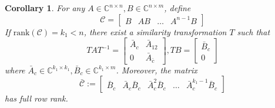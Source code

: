 \documentclass[
]{book}
\newtheorem{corollary}{Corollary}[chapter]
\theoremstyle{definition}
\theoremstyle{definition}
\theoremstyle{definition}
\theoremstyle{definition}
\theoremstyle{remark}
\begin{document}
\begin{corollary}
\protect\hypertarget{cor:cayham-3}{}\label{cor:cayham-3}For any \(A \in \mathbb{C}^{n \times n}, B \in \mathbb{C}^{n \times m}\), define
\[
   \mathcal{C} = \begin{bmatrix} B & AB & \dots & A^{n-1} B \end{bmatrix}
\]
If \(\text{rank}(\mathcal{C}) = k_1 < n\), there exist a similarity transformation \(T\) such that
\[
   T A T^{-1} = \begin{bmatrix}
      \bar{A}_c & \bar{A}_{12} \\
      0 & \bar{A}_{\bar{c}} 
   \end{bmatrix}, T B = \begin{bmatrix}
      \bar{B}_c \\ 0
   \end{bmatrix}
\]
where \(\bar{A}_c \in \mathbb{C}^{k_1 \times k_1}, \bar{B}_c \in \mathbb{C}^{k_1 \times m}\). Moreover, the matrix
\begin{equation*}
   \bar{\mathcal{C}} := \begin{bmatrix}
      \bar{B}_c & \bar{A}_c \bar{B}_c & \bar{A}_c^2 \bar{B}_c & \dots & \bar{A}_c^{k_1 - 1} \bar{B}_c
   \end{bmatrix}
\end{equation*}
has full row rank.
\end{corollary}
\end{document}
